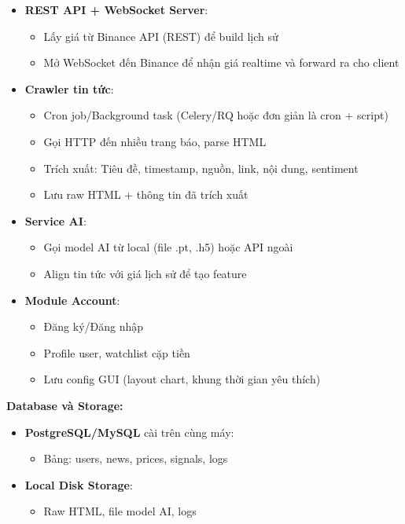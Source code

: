 \begin{itemize}
    \item \textbf{REST API + WebSocket Server}:
    \begin{itemize}
        \item Lấy giá từ Binance API (REST) để build lịch sử
        \item Mở WebSocket đến Binance để nhận giá realtime và forward ra cho client
    \end{itemize}
    
    \item \textbf{Crawler tin tức}:
    \begin{itemize}
        \item Cron job/Background task (Celery/RQ hoặc đơn giản là cron + script)
        \item Gọi HTTP đến nhiều trang báo, parse HTML
        \item Trích xuất: Tiêu đề, timestamp, nguồn, link, nội dung, sentiment
        \item Lưu raw HTML + thông tin đã trích xuất
    \end{itemize}
    
    \item \textbf{Service AI}:
    \begin{itemize}
        \item Gọi model AI từ local (file .pt, .h5) hoặc API ngoài
        \item Align tin tức với giá lịch sử để tạo feature
    \end{itemize}
    
    \item \textbf{Module Account}:
    \begin{itemize}
        \item Đăng ký/Đăng nhập
        \item Profile user, watchlist cặp tiền
        \item Lưu config GUI (layout chart, khung thời gian yêu thích)
    \end{itemize}
\end{itemize}

\noindent\textbf{Database và Storage:}

\begin{itemize}
    \item \textbf{PostgreSQL/MySQL} cài trên cùng máy:
    \begin{itemize}
        \item Bảng: users, news, prices, signals, logs
    \end{itemize}
    \item \textbf{Local Disk Storage}:
    \begin{itemize}
        \item Raw HTML, file model AI, logs
    \end{itemize}
\end{itemize}

